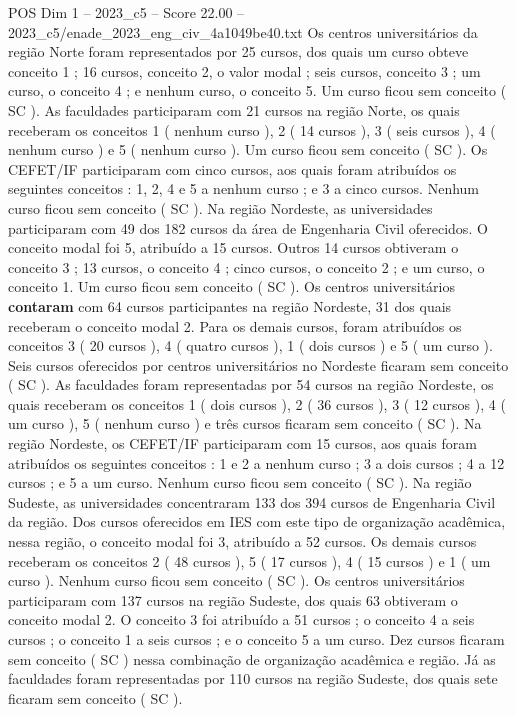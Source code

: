 \begin{textsample}{POS Dim 1 – 2023\_c5 – Score 22.00 – 2023\_c5/enade\_2023\_eng\_civ\_4a1049be40.txt}
Os centros universitários da região Norte foram representados por 25 cursos, dos quais um curso obteve conceito 1 ; 16 cursos, conceito 2, o valor modal ; seis cursos, conceito 3 ; um curso, o conceito 4 ; e nenhum curso, o conceito 5.
Um curso ficou sem conceito ( SC ).
As faculdades participaram com 21 cursos na região Norte, os quais receberam os conceitos 1 ( nenhum curso ), 2 ( 14 cursos ), 3 ( seis cursos ), 4 ( nenhum curso ) e 5 ( nenhum curso ).
Um curso ficou sem conceito ( SC ).
Os CEFET/IF participaram com cinco cursos, aos quais foram atribuídos os seguintes conceitos : 1, 2, 4 e 5 a nenhum curso ; e 3 a cinco cursos.
Nenhum curso ficou sem conceito ( SC ).
Na região Nordeste, as universidades participaram com 49 dos 182 cursos da área de Engenharia Civil oferecidos.
O conceito modal foi 5, atribuído a 15 cursos.
Outros 14 cursos obtiveram o conceito 3 ; 13 cursos, o conceito 4 ; cinco cursos, o conceito 2 ; e um curso, o conceito 1.
Um curso ficou sem conceito ( SC ).
Os centros universitários \textbf{contaram} com 64 cursos participantes na região Nordeste, 31 dos quais receberam o conceito modal 2.
Para os demais cursos, foram atribuídos os conceitos 3 ( 20 cursos ), 4 ( quatro cursos ), 1 ( dois cursos ) e 5 ( um curso ).
Seis cursos oferecidos por centros universitários no Nordeste ficaram sem conceito ( SC ).
As faculdades foram representadas por 54 cursos na região Nordeste, os quais receberam os conceitos 1 ( dois cursos ), 2 ( 36 cursos ), 3 ( 12 cursos ), 4 ( um curso ), 5 ( nenhum curso ) e três cursos ficaram sem conceito ( SC ).
Na região Nordeste, os CEFET/IF participaram com 15 cursos, aos quais foram atribuídos os seguintes conceitos : 1 e 2 a nenhum curso ; 3 a dois cursos ; 4 a 12 cursos ; e 5 a um curso.
Nenhum curso ficou sem conceito ( SC ).
Na região Sudeste, as universidades concentraram 133 dos 394 cursos de Engenharia Civil da região.
Dos cursos oferecidos em IES com este tipo de organização acadêmica, nessa região, o conceito modal foi 3, atribuído a 52 cursos.
Os demais cursos receberam os conceitos 2 ( 48 cursos ), 5 ( 17 cursos ), 4 ( 15 cursos ) e 1 ( um curso ).
Nenhum curso ficou sem conceito ( SC ).
Os centros universitários participaram com 137 cursos na região Sudeste, dos quais 63 obtiveram o conceito modal 2.
O conceito 3 foi atribuído a 51 cursos ; o conceito 4 a seis cursos ; o conceito 1 a seis cursos ; e o conceito 5 a um curso.
Dez cursos ficaram sem conceito ( SC ) nessa combinação de organização acadêmica e região.
Já as faculdades foram representadas por 110 cursos na região Sudeste, dos quais sete ficaram sem conceito ( SC ).

\end{textsample}
